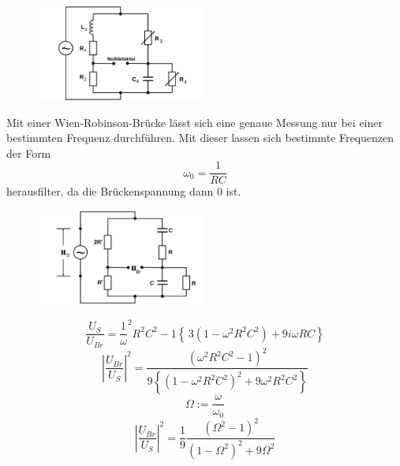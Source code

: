 \begin{figure}
  \centering
  \includegraphics[width=0.5\textwidth]{Bilder/Maxwellbruecke.png}
  \caption{}
  \label{fig:Maxwellb}
\end{figure}
Mit einer Wien-Robinson-Brücke lässt sich eine genaue Messung nur bei einer
bestimmten Frequenz durchführen. Mit dieser lassen sich bestimmte Frequenzen der
Form
\begin{equation}
\omega_0=\frac{1}{RC}
\end{equation}
herausfilter, da die Brückenspannung dann $0$ ist.
\begin{figure}
  \centering
  \includegraphics[width=0.5\textwidth]{Bilder/Wien_Robinsonbruecke.png}
  \caption{}
  \label{fig:Maxwellb}
\end{figure}
\begin{equation}
\frac{U_S}{U_{Br}}=\frac{1}{\omega}^2R^2C^2-1\left\{\,3(1-\omega^2 R^2 C^2)
+9i\omega RC \right\}
\end{equation}
\begin{equation}
\left|\frac{U_{Br}}{U_S}\right|^2=\frac{(\omega^2R^2C^2-1)^2}
{9\left\{(1-\omega^2 R^2 C^2)^2+9\omega^2R^2C^2\right\}}
\end{equation}
\begin{equation}
\Omega:=\frac{\omega}{\omega_0}
\end{equation}
\begin{equation}
\left|\frac{U_{Br}}{U_S}\right|^2=\frac{1}{9}\frac{(\Omega^2-1)^2}
{(1-\Omega^2)^2+9\Omega^2}
\end{equation}
